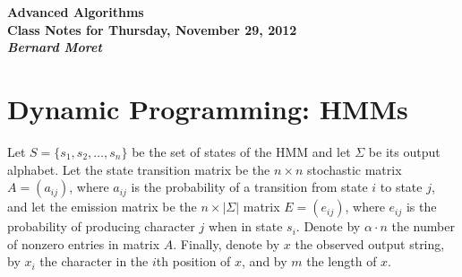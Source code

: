 \documentclass[11pt]{article}
\begin{document}
\begin{center}
  \LARGE\bf Advanced Algorithms\\

  \Large\sf
  Class Notes for Thursday, November 29, 2012\\

  \it
  Bernard Moret
\end{center}

\bigskip

\section{Dynamic Programming: HMMs}
Let $S=\{s_1, s_2, \ldots, s_n\}$ be the set of states of the HMM and
let $\Sigma$ be its output alphabet.
Let the state transition matrix
be the $n\times n$ stochastic matrix $A = \left( a_{ij}\right)$,
where $a_{ij}$ is the probability of a transition from state $i$
to state $j$, and let the emission matrix be the $n\times |\Sigma|$ matrix
$E = \left( e_{ij}\right)$, where $e_{ij}$ is the probability of
producing character $j$ when in state $s_i$.  Denote by $\alpha\cdot n$
the number of nonzero entries in matrix $A$.
Finally, denote by $x$ the observed output string, by $x_i$ the character in
the $i$th position of $x$, and by $m$ the length of $x$.
\end{document}
